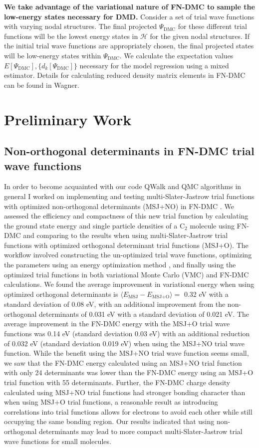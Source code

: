 \documentclass[12pt]{article}
\begin{document}
\textbf{We take advantage of the variational nature of FN-DMC to sample the low-energy states necessary for DMD.}
Consider a set of trial wave functions with varying nodal structures.
The final projected $\Psi_\text{DMC}$ for these different trial functions will be the lowest energy states in $\mathcal{H}$ for the given nodal structures.
If the initial trial wave functions are appropriately chosen, the final projected states will be low-energy states within $\Psi_\text{DMC}$.
We calculate the expectation values $E[\Psi_\text{DMC}], \{d_k[\Psi_\text{DMC}]\}$ necessary for the model regression using a mixed estimator.
Details for calculating reduced density matrix elements in FN-DMC can be found in Wagner.

\section{Preliminary Work}
\subsection{Non-orthogonal determinants in FN-DMC trial wave functions}
In order to become acquainted with our code QWalk \cite{WAGNER20093390} and QMC algorithms in general I worked on implementing and testing multi-Slater-Jastrow trial functions with optimized non-orthogonal determinants (MSJ+NO) in FN-DMC \cite{Pathak2018}.
We assessed the efficiency and compactness of this new trial function by calculating the ground state energy and single particle densities of a C$_2$ molecule using FN-DMC and comparing to the results when using multi-Slater-Jastrow trial functions with optimized orthogonal determinant trial functions (MSJ+O). 
The workflow involved constructing the un-optimized trial wave functions, optimizing the parameters using an energy optimization method \cite{Toulouse2007}, and finally using the optimized trial functions in both variational Monte Carlo (VMC) and FN-DMC calculations. 
We found the average improvement in variational energy when using optimized orthogonal determinants is $\langle E_\text{MSJ} - E_\text{MSJ+O} \rangle = $ 0.32 eV with a standard deviation of 0.08 eV, with an additional improvement from the non-orthogonal determinants of 0.031 eV with a standard deviation of 0.021 eV.
The average improvement in the FN-DMC energy with the MSJ+O trial wave functions was 0.14 eV (standard deviation 0.03 eV) with an additional reduction of 0.032 eV (standard deviation 0.019 eV) when using the MSJ+NO trial wave function.
While the benefit using the MSJ+NO trial wave function seems small, we saw that the FN-DMC energy calculated using an MSJ+NO trial function with only 24 determinants was lower than the FN-DMC energy using an MSJ+O trial function with 55 determinants.
Further, the FN-DMC charge density calculated using MSJ+NO trial functions had stronger bonding character than when using MSJ+O trial functions, a reasonable result as introducing correlations into trial functions allows for electrons to avoid each other while still occupying the same bonding region. 
Our results indicated that using non-orthogonal determinants may lead to more compact multi-Slater-Jastrow trial wave functions for small molecules.
\end{document}
